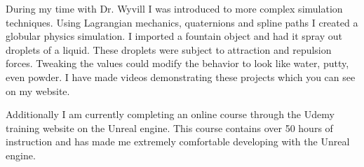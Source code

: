 During my time with Dr. Wyvill I was introduced to more complex simulation techniques.
Using Lagrangian mechanics, quaternions and spline paths I created a globular physics simulation. 
I imported a fountain object and had it spray out droplets of a liquid.
These droplets were subject to attraction and repulsion forces.
Tweaking the values could modify the behavior to look like water, putty, even powder.
I have made videos demonstrating these projects which you can see on my website.

Additionally I am currently completing an online course through the Udemy training website on the Unreal engine.
This course contains over 50 hours of instruction and has made me extremely comfortable developing with the Unreal engine.